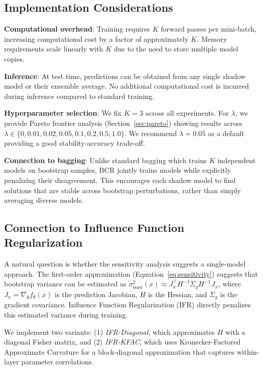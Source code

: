 \documentclass[12pt, letterpaper]{article}
\begin{document}
\subsection{Implementation Considerations}

\textbf{Computational overhead}: Training requires $K$ forward passes per mini-batch, increasing computational cost by a factor of approximately $K$. Memory requirements scale linearly with $K$ due to the need to store multiple model copies.

\textbf{Inference}: At test time, predictions can be obtained from any single shadow model or their ensemble average. No additional computational cost is incurred during inference compared to standard training.

\textbf{Hyperparameter selection}: We fix $K=3$ across all experiments. For $\lambda$, we provide Pareto frontier analysis (Section~\ref{sec:pareto}) showing results across $\lambda \in \{0, 0.01, 0.02, 0.05, 0.1, 0.2, 0.5, 1.0\}$. We recommend $\lambda = 0.05$ as a default providing a good stability-accuracy trade-off.

\textbf{Connection to bagging}: Unlike standard bagging \citep{breiman1996bagging} which trains $K$ independent models on bootstrap samples, BCR jointly trains models while explicitly penalizing their disagreement. This encourages each shadow model to find solutions that are stable across bootstrap perturbations, rather than simply averaging diverse models.

\subsection{Connection to Influence Function Regularization}

A natural question is whether the sensitivity analysis suggests a single-model approach. The first-order approximation (Equation~\ref{eq:sensitivity}) suggests that bootstrap variance can be estimated as $\sigma^2_{\text{boot}}(x) \approx J_x^\top H^{-1} \Sigma_g H^{-1} J_x$, where $J_x = \nabla_\theta f_\theta(x)$ is the prediction Jacobian, $H$ is the Hessian, and $\Sigma_g$ is the gradient covariance. Influence Function Regularization (IFR) directly penalizes this estimated variance during training.

We implement two variants: (1) \emph{IFR-Diagonal}, which approximates $H$ with a diagonal Fisher matrix, and (2) \emph{IFR-KFAC}, which uses Kronecker-Factored Approximate Curvature \citep{martens2015optimizing} for a block-diagonal approximation that captures within-layer parameter correlations.
\end{document}
